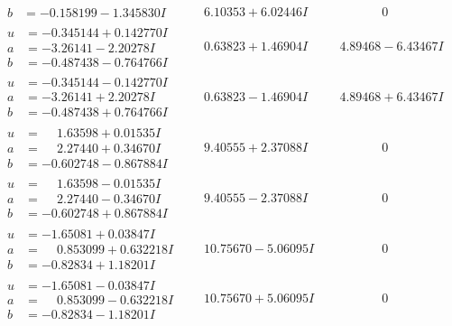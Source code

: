 \documentclass[1p]{elsarticle_modified}
\theoremstyle{definition}
\begin{document}
$$\begin{array}{c|c|c}
\begin{aligned}
b &= -0.158199 - 1.345830 I\end{aligned}
 & \phantom{-}6.10353 + 6.02446 I & \phantom{-0.000000 } 0 \\ \hline\begin{aligned}
u &= -0.345144 + 0.142770 I \\
a &= -3.26141 - 2.20278 I \\
b &= -0.487438 - 0.764766 I\end{aligned}
 & \phantom{-}0.63823 + 1.46904 I & \phantom{-}4.89468 - 6.43467 I \\ \hline\begin{aligned}
u &= -0.345144 - 0.142770 I \\
a &= -3.26141 + 2.20278 I \\
b &= -0.487438 + 0.764766 I\end{aligned}
 & \phantom{-}0.63823 - 1.46904 I & \phantom{-}4.89468 + 6.43467 I \\ \hline\begin{aligned}
u &= \phantom{-}1.63598 + 0.01535 I \\
a &= \phantom{-}2.27440 + 0.34670 I \\
b &= -0.602748 - 0.867884 I\end{aligned}
 & \phantom{-}9.40555 + 2.37088 I & \phantom{-0.000000 } 0 \\ \hline\begin{aligned}
u &= \phantom{-}1.63598 - 0.01535 I \\
a &= \phantom{-}2.27440 - 0.34670 I \\
b &= -0.602748 + 0.867884 I\end{aligned}
 & \phantom{-}9.40555 - 2.37088 I & \phantom{-0.000000 } 0 \\ \hline\begin{aligned}
u &= -1.65081 + 0.03847 I \\
a &= \phantom{-}0.853099 + 0.632218 I \\
b &= -0.82834 + 1.18201 I\end{aligned}
 & \phantom{-}10.75670 - 5.06095 I & \phantom{-0.000000 } 0 \\ \hline\begin{aligned}
u &= -1.65081 - 0.03847 I \\
a &= \phantom{-}0.853099 - 0.632218 I \\
b &= -0.82834 - 1.18201 I\end{aligned}
 & \phantom{-}10.75670 + 5.06095 I & \phantom{-0.000000 } 0 \\ \hline\begin{aligned}

\end{aligned}
\end{array}$$
\end{document}
